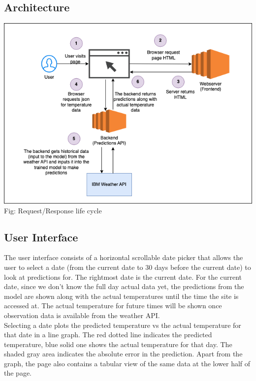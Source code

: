 \documentclass[paper=a4, fontsize=11pt, margin=1in]{scrartcl}
\numberwithin{equation}{section}		%
\numberwithin{figure}{section}			%
\numberwithin{table}{section}				%
\begin{document}
\subsection{\textbf{Architecture}}
\begin{center}
    \includegraphics[width=1\textwidth]{weather-requests.drawio.png}\\
    Fig: Request/Response life cycle
\end{center}
\pagebreak

\subsection{\textbf{User Interface}}

The user interface consists of a horizontal scrollable date picker that allows the user to select a date (from the current date to 30 days before the current date) to look at predictions for. The rightmost date is the current date. For the current date, since we don't know the full day actual data yet, the predictions from the model are shown along with the actual temperatures until the time the site is accessed at. The actual temperature for future times will be shown once observation data is available from the weather API.\\

Selecting a date plots the predicted temperature vs the actual temperature for that date in a line graph. The red dotted line indicates the predicted temperature, blue solid one shows the actual temperature for that day. The shaded gray area indicates the absolute error in the prediction. Apart from the graph, the page also contains a tabular view of the same data at the lower half of the page.\\
\end{document}
